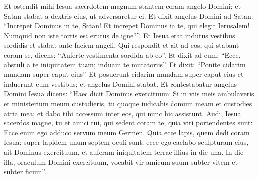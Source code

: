 \begin{biblechapter}
\begin{biblechapter}
\begin{biblechapter}
\verse Et ostendit mihi Iesua sacerdotem magnum stantem coram angelo Domini; et Satan stabat a dextris eius, ut adversaretur ei.
 \verse Et dixit angelus Domini ad Satan: “Increpet Dominus in te, Satan! Et increpet Dominus in te, qui elegit Ierusalem! Numquid non iste torris est erutus de igne?”. 
\verse Et Iesua erat indutus vestibus sordidis et stabat ante faciem angeli. 
\verse Qui respondit et ait ad eos, qui stabant coram se, dicens: “Auferte vestimenta sordida ab eo”. Et dixit ad eum: “Ecce, abstuli a te iniquitatem tuam; induam te mutatoriis”. 
\verse Et dixit: “Ponite cidarim mundam super caput eius”. Et posuerunt cidarim mundam super caput eius et induerunt eum vestibus; et angelus Domini stabat.
 \verse Et contestabatur angelus Domini Iesua dicens: 
\verse “Haec dicit Dominus exercituum: Si in viis meis ambulaveris et ministerium meum custodieris, tu quoque iudicabis domum meam et custodies atria mea; et dabo tibi accessum inter eos, qui nunc hic assistunt.
 \verse Audi, Iesua sacerdos magne, tu et amici tui, qui sedent coram te, quia viri portendentes sunt: Ecce enim ego adduco servum meum Germen. 
\verse Quia ecce lapis, quem dedi coram Iesua: super lapidem unum septem oculi sunt; ecce ego caelabo sculpturam eius, ait Dominus exercituum, et auferam iniquitatem terrae illius in die una. 
\verse In die illa, oraculum Domini exercituum, vocabit vir amicum suum subter vitem et subter ficum”.
 

\end{biblechapter}
\end{biblechapter}
\end{biblechapter}
